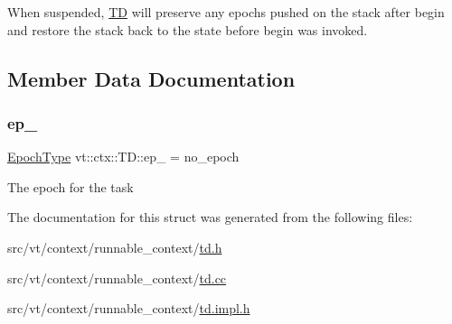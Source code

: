 When suspended, {\ttfamily \hyperlink{structvt_1_1ctx_1_1_t_d}{TD}} will preserve any epochs pushed on the stack after begin and restore the stack back to the state before begin was invoked. 



\subsection{Member Data Documentation}
\mbox{\label{structvt_1_1ctx_1_1_t_d_a27c1d8888dd9b0fcc0b6a8f31f7ebdb7}} 
\subsubsection{\texorpdfstring{ep\+\_\+}{ep\_}}
{\footnotesize\ttfamily \hyperlink{namespacevt_a81d11b28122d43bf9834577e4a06440f}{Epoch\+Type} vt\+::ctx\+::\+T\+D\+::ep\+\_\+ = no\+\_\+epoch\hspace{0.3cm}{\ttfamily [private]}}

The epoch for the task 

The documentation for this struct was generated from the following files\+:\begin{DoxyCompactItemize}
\item 
src/vt/context/runnable\+\_\+context/\hyperlink{td_8h}{td.\+h}\item 
src/vt/context/runnable\+\_\+context/\hyperlink{td_8cc}{td.\+cc}\item 
src/vt/context/runnable\+\_\+context/\hyperlink{td_8impl_8h}{td.\+impl.\+h}\end{DoxyCompactItemize}
